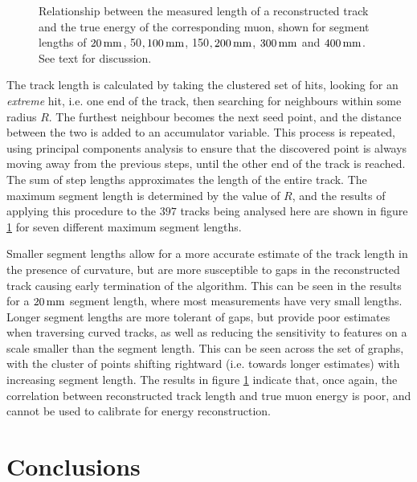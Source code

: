 \begin{figure}
{    }
    \caption[Relationship between track length and muon energy]{\label{fig:energy-recon-track-length}Relationship between the measured length of a reconstructed track and the true energy of the corresponding muon, shown for segment lengths of $20\,\mathrm{mm}$, 50\mm$, 100\,\mathrm{mm}$, 150\mm$, 200\,\mathrm{mm}$, $300\,\mathrm{mm}$ and $400\,\mathrm{mm}$. See text for discussion.}    
\end{figure}

The track length is calculated by taking the clustered set of hits, looking for an \emph{extreme} hit, i.e. one end of the track, then searching for neighbours within some radius $R$. The furthest neighbour becomes the next seed point, and the distance between the two is added to an accumulator variable. This process is repeated, using principal components analysis to ensure that the discovered point is always moving away from the previous steps, until the other end of the track is reached. The sum of step lengths approximates the length of the entire track. The maximum segment length is determined by the value of $R$, and the results of applying this procedure to the $397$ tracks being analysed here are shown in figure \ref{fig:energy-recon-track-length} for seven different maximum segment lengths.

Smaller segment lengths allow for a more accurate estimate of the track length in the presence of curvature, but are more susceptible to gaps in the reconstructed track causing early termination of the algorithm. This can be seen in the results for a $20\,\mathrm{mm}$ segment length, where most measurements have very small lengths. Longer segment lengths are more tolerant of gaps, but provide poor estimates when traversing curved tracks, as well as reducing the sensitivity to features on a scale smaller than the segment length. This can be seen across the set of graphs, with the cluster of points shifting rightward (i.e. towards longer estimates) with increasing segment length. The results in figure \ref{fig:energy-recon-track-length} indicate that, once again, the correlation between reconstructed track length and true muon energy is poor, and cannot be used to calibrate for energy reconstruction.

\section{Conclusions}
